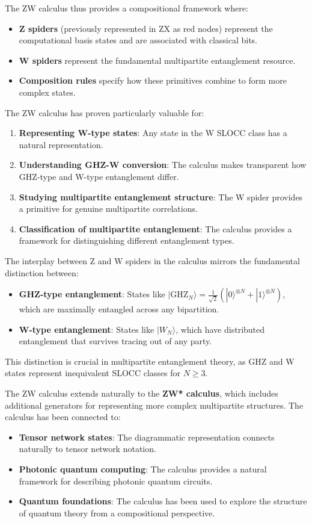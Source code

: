 \documentclass[12pt,a4paper]{article}
\begin{document}
The ZW calculus thus provides a compositional framework where:
\begin{itemize}
	\item \textbf{Z spiders} (previously represented in ZX as red nodes) represent the computational basis states and are associated with classical bits.
	\item \textbf{W spiders} represent the fundamental multipartite entanglement resource.
	\item \textbf{Composition rules} specify how these primitives combine to form more complex states.
\end{itemize}

The ZW calculus has proven particularly valuable for:
\begin{enumerate}
	\item \textbf{Representing W-type states}: Any state in the W SLOCC class has a natural representation.
	\item \textbf{Understanding GHZ-W conversion}: The calculus makes transparent how GHZ-type and W-type entanglement differ.
	\item \textbf{Studying multipartite entanglement structure}: The W spider provides a primitive for genuine multipartite correlations.
	\item \textbf{Classification of multipartite entanglement}: The calculus provides a framework for distinguishing different entanglement types.
\end{enumerate}

The interplay between Z and W spiders in the calculus mirrors the fundamental distinction between:
\begin{itemize}
	\item \textbf{GHZ-type entanglement}: States like $|\text{GHZ}_N\rangle = \frac{1}{\sqrt{2}}(|0\rangle^{\otimes N} + |1\rangle^{\otimes N})$, which are maximally entangled across any bipartition.
	\item \textbf{W-type entanglement}: States like $|W_N\rangle$, which have distributed entanglement that survives tracing out of any party.
\end{itemize}

This distinction is crucial in multipartite entanglement theory, as GHZ and W states represent inequivalent SLOCC classes for $N \geq 3$.

The ZW calculus extends naturally to the \textbf{ZW* calculus}, which includes additional generators for representing more complex multipartite structures. The calculus has been connected to:
\begin{itemize}
	\item \textbf{Tensor network states}: The diagrammatic representation connects naturally to tensor network notation.
	\item \textbf{Photonic quantum computing}: The calculus provides a natural framework for describing photonic quantum circuits.
	\item \textbf{Quantum foundations}: The calculus has been used to explore the structure of quantum theory from a compositional perspective.
\end{itemize}
\end{document}
